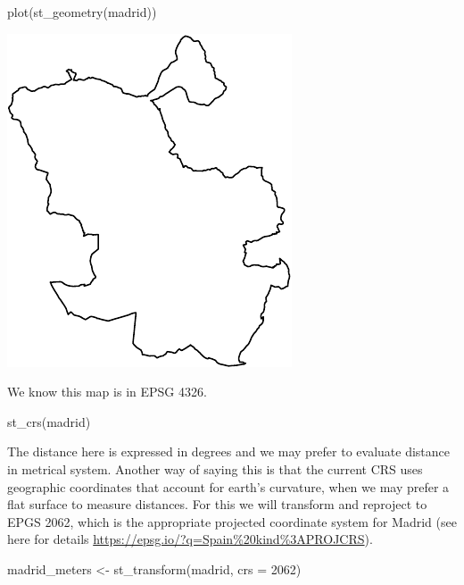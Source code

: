 \documentclass[
]{book}
\newenvironment{Shaded}{\begin{snugshade}}{\end{snugshade}}
\newcommand{\AttributeTok}[1]{\textcolor[rgb]{0.77,0.63,0.00}{#1}}
\newcommand{\DecValTok}[1]{\textcolor[rgb]{0.00,0.00,0.81}{#1}}
\newcommand{\FunctionTok}[1]{\textcolor[rgb]{0.00,0.00,0.00}{#1}}
\newcommand{\NormalTok}[1]{#1}
\newcommand{\OtherTok}[1]{\textcolor[rgb]{0.56,0.35,0.01}{#1}}
\begin{document}
\begin{Shaded}
\begin{Highlighting}[]
\FunctionTok{plot}\NormalTok{(}\FunctionTok{st\_geometry}\NormalTok{(madrid))}
\end{Highlighting}
\end{Shaded}

\includegraphics{crime_mapping_files/figure-latex/unnamed-chunk-65-1.pdf}

We know this map is in EPSG 4326.

\begin{Shaded}
\begin{Highlighting}[]
\FunctionTok{st\_crs}\NormalTok{(madrid)}
\end{Highlighting}
\end{Shaded}

The distance here is expressed in degrees and we may prefer to evaluate distance in metrical system. Another way of saying this is that the current CRS uses geographic coordinates that account for earth's curvature, when we may prefer a flat surface to measure distances. For this we will transform and reproject to EPGS 2062, which is the appropriate projected coordinate system for Madrid (see here for details \url{https://epsg.io/?q=Spain\%20kind\%3APROJCRS}).

\begin{Shaded}
\begin{Highlighting}[]
\NormalTok{madrid\_meters }\OtherTok{\textless{}{-}} \FunctionTok{st\_transform}\NormalTok{(madrid, }\AttributeTok{crs =} \DecValTok{2062}\NormalTok{)}
\end{Highlighting}
\end{Shaded}
\end{document}
